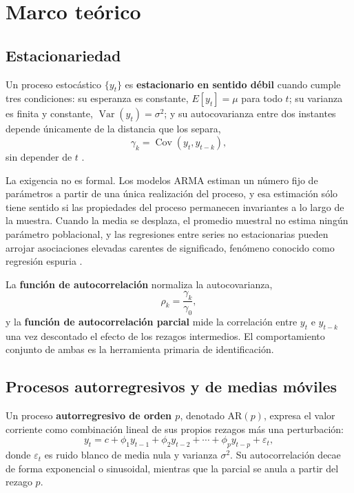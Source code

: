 \section{Marco teórico}

\subsection{Estacionariedad}

Un proceso estocástico $\{y_t\}$ es \textbf{estacionario en sentido débil} cuando cumple tres
condiciones: su esperanza es constante, $E[y_t] = \mu$ para todo $t$; su varianza es finita y
constante, $\operatorname{Var}(y_t) = \sigma^2$; y su autocovarianza entre dos instantes
depende únicamente de la distancia que los separa,
\begin{equation}
\gamma_k = \operatorname{Cov}(y_t, y_{t-k}),
\end{equation}
sin depender de $t$ \parencite{box2015}.

La exigencia no es formal. Los modelos ARMA estiman un número fijo de parámetros a partir de
una única realización del proceso, y esa estimación sólo tiene sentido si las propiedades del
proceso permanecen invariantes a lo largo de la muestra. Cuando la media se desplaza, el
promedio muestral no estima ningún parámetro poblacional, y las regresiones entre series no
estacionarias pueden arrojar asociaciones elevadas carentes de significado, fenómeno conocido
como regresión espuria \parencite{box2015}.

La \textbf{función de autocorrelación} normaliza la autocovarianza,
\begin{equation}
\rho_k = \frac{\gamma_k}{\gamma_0},
\end{equation}
y la \textbf{función de autocorrelación parcial} mide la correlación entre $y_t$ e $y_{t-k}$
una vez descontado el efecto de los rezagos intermedios. El comportamiento conjunto de ambas es la herramienta primaria de identificación.

\subsection{Procesos autorregresivos y de medias móviles}

Un proceso \textbf{autorregresivo de orden $p$}, denotado AR$(p)$, expresa el valor corriente
como combinación lineal de sus propios rezagos más una perturbación:
\begin{equation}
y_t = c + \phi_1 y_{t-1} + \phi_2 y_{t-2} + \cdots + \phi_p y_{t-p} + \varepsilon_t,
\end{equation}
donde $\varepsilon_t$ es ruido blanco de media nula y varianza $\sigma^2$. Su autocorrelación decae de forma exponencial o sinusoidal, mientras que la parcial se anula a
partir del rezago $p$.

